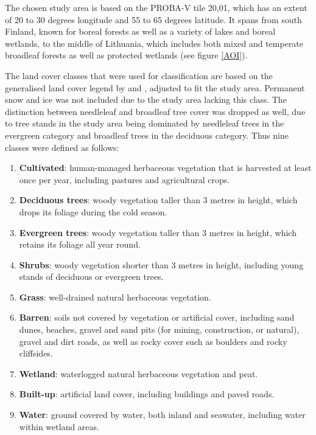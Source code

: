 \documentclass[a4paper,12pt]{scrbook}
\begin{document}
The chosen study area is based on the PROBA-V tile 20,01, which has an extent of 20 to 30 degrees longitude and 55 to 65 degrees latitude. It spans from south Finland, known for boreal forests as well as a variety of lakes and boreal wetlands, to the middle of Lithuania, which includes both mixed and temperate broadleaf forests as well as protected wetlands (see figure \ref{AOI}).

The land cover classes that were used for classification are based on the generalised land cover legend by \citet{see2015hybrid} and \citet{Herold2008lccomparison}, adjusted to fit the study area. Permanent snow and ice was not included due to the study area lacking this class. The distinction between needleleaf and broadleaf tree cover was dropped as well, due to tree stands in the study area being dominated by needleleaf trees in the evergreen category and broadleaf trees in the deciduous category. Thus nine classes were defined as follows:

\begin{enumerate}
 \item \textbf{Cultivated}: human-managed herbaceous vegetation that is harvested at least once per year, including pastures and agricultural crops.
 \item \textbf{Deciduous trees}: woody vegetation taller than 3 metres in height, which drops its foliage during the cold season.
 \item \textbf{Evergreen trees}: woody vegetation taller than 3 metres in height, which retains its foliage all year round.
 \item \textbf{Shrubs}: woody vegetation shorter than 3 metres in height, including young stands of deciduous or evergreen trees.
 \item \textbf{Grass}: well-drained natural herbaceous vegetation.
 \item \textbf{Barren}: soils not covered by vegetation or artificial cover, including sand dunes, beaches, gravel and sand pits (for mining, construction, or natural), gravel and dirt roads, as well as rocky cover such as boulders and rocky cliffsides.
 \item \textbf{Wetland}: waterlogged natural herbaceous vegetation and peat.
 \item \textbf{Built-up}: artificial land cover, including buildings and paved roads.
 \item \textbf{Water}: ground covered by water, both inland and seawater, including water within wetland areas.
\end{enumerate}
\end{document}
